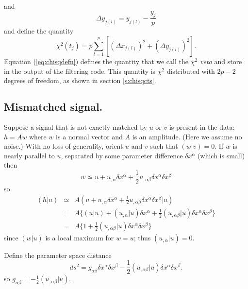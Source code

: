 and
\begin{equation}
\Delta y_{j(l)} = y_{j(l)} - \frac{y_j}{p}
\end{equation}
and define the quantity
\begin{equation}
\chi^2(t_j) = p \sum_{l = 1}^p \left[ \left(\Delta x_{j(l)}\right)^2 + \left(\Delta y_{j(l)}\right)^2 \right].
\label{eq:chisqdefn}
\end{equation}
Equation (\ref{eq:chisqdefn}) defines the quantity that we call the
\emph{$\chi^2$ veto} and store in the output of the filtering code.  This
quantity is $\chi^2$ distributed with $2p-2$ degrees of freedom, as shown in
section \ref{s:chisqcts}.

\subsection{Mismatched signal.}
Suppose a signal that is not exactly matched by $u$ or $v$ is present in
the data: $h=Aw$ where $w$ is a normal vector and $A$ is an amplitude.
(Here we assume no noise.)  With no loss of generality, orient $u$ and $v$
such that $(w|v)=0$.  If $w$ is nearly parallel to $u$, separated by some
parameter difference $\delta x^\alpha$ (which is small) then
\begin{equation}
  w \simeq u + u_{,\alpha}\delta x^\alpha 
  + {\textstyle{\frac{1}{2}}}u_{,\alpha\beta}\delta x^\alpha\delta x^\beta
\end{equation}
so
\begin{eqnarray}
  (h|u) &\simeq& A(u + u_{,\alpha}\delta x^\alpha 
  + {\textstyle{\frac{1}{2}}} u_{,\alpha\beta}\delta x^\alpha\delta x^\beta|u)
  \nonumber\\
  &=& A\bigl\{ (u|u) + (u_{,\alpha}|u)\delta x^\alpha
  + {\textstyle{\frac{1}{2}}} (u_{,\alpha\beta}|u)\delta x^\alpha\delta x^\beta
  \bigr\}\nonumber\\
  &=& A\bigl\{ 1 +
  {\textstyle{\frac{1}{2}}} (u_{,\alpha\beta}|u)\delta x^\alpha\delta x^\beta
  \bigr\}
\end{eqnarray}
since $(w|u)$ is a local maximum for $w=u$; thus $(u_{,\alpha}|u)=0$.

Define the parameter space distance
\begin{equation}
  ds^2 = g_{\alpha\beta}\delta x^\alpha\delta x^\beta
  - {\textstyle{\frac{1}{2}}} (u_{,\alpha\beta}|u)\delta x^\alpha\delta x^\beta.
\end{equation}
so $g_{\alpha\beta}=-{\textstyle{\frac{1}{2}}}(u_{,\alpha\beta}|u)$.


